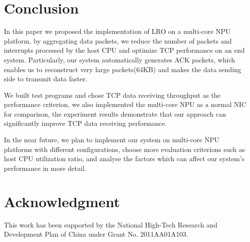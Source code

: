 \documentclass[conference]{IEEEtran}
\begin{document}




\section{Conclusion}
In this paper we proposed the implementation of LRO on a multi-core NPU platform, by aggregating data packets, we reduce the number of packets and interrupts processed by the host CPU and optimize TCP performance on an end system. Particularly, our system automatically generates ACK packets, which enables us to reconstruct very large packets(64KB) and makes the data sending side to transmit data faster.

We built test programs and chose TCP data receiving throughput as the performance criterion, we also implemented the multi-core NPU as a normal NIC for comparison, the experiment results demonstrate that our approach can significantly improve TCP data receiving performance.

In the near future, we plan to implement our system on multi-core NPU platforms with different configurations, choose more evaluation criterions such as host CPU utilization ratio, and analyse the factors which can affect our system's performance in more detail.


\section*{Acknowledgment}
This work has been supported by the National High-Tech Research and Development Plan of China under Grant No. 2011AA01A103.




\end{document}
